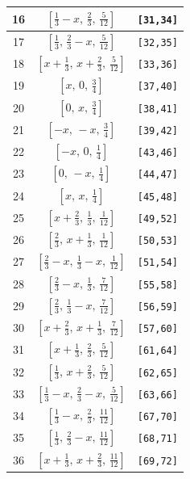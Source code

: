 \documentclass[fleqn,8pt]{jsarticle}
\begin{document}
\begin{longtable}{ccc}
16 & $\left[ \frac{1}{3} - x,\, \frac{2}{3},\, \frac{5}{12} \right]$ & {\tt [31,34]} \\ \hline
17 & $\left[ \frac{1}{3},\, \frac{2}{3} - x,\, \frac{5}{12} \right]$ & {\tt [32,35]} \\ \hline
18 & $\left[ x + \frac{1}{3},\, x + \frac{2}{3},\, \frac{5}{12} \right]$ & {\tt [33,36]} \\ \hline
19 & $\left[ x,\, 0,\, \frac{3}{4} \right]$ & {\tt [37,40]} \\ \hline
20 & $\left[ 0,\, x,\, \frac{3}{4} \right]$ & {\tt [38,41]} \\ \hline
21 & $\left[ - x,\, - x,\, \frac{3}{4} \right]$ & {\tt [39,42]} \\ \hline
22 & $\left[ - x,\, 0,\, \frac{1}{4} \right]$ & {\tt [43,46]} \\ \hline
23 & $\left[ 0,\, - x,\, \frac{1}{4} \right]$ & {\tt [44,47]} \\ \hline
24 & $\left[ x,\, x,\, \frac{1}{4} \right]$ & {\tt [45,48]} \\ \hline
25 & $\left[ x + \frac{2}{3},\, \frac{1}{3},\, \frac{1}{12} \right]$ & {\tt [49,52]} \\ \hline
26 & $\left[ \frac{2}{3},\, x + \frac{1}{3},\, \frac{1}{12} \right]$ & {\tt [50,53]} \\ \hline
27 & $\left[ \frac{2}{3} - x,\, \frac{1}{3} - x,\, \frac{1}{12} \right]$ & {\tt [51,54]} \\ \hline
28 & $\left[ \frac{2}{3} - x,\, \frac{1}{3},\, \frac{7}{12} \right]$ & {\tt [55,58]} \\ \hline
29 & $\left[ \frac{2}{3},\, \frac{1}{3} - x,\, \frac{7}{12} \right]$ & {\tt [56,59]} \\ \hline
30 & $\left[ x + \frac{2}{3},\, x + \frac{1}{3},\, \frac{7}{12} \right]$ & {\tt [57,60]} \\ \hline
31 & $\left[ x + \frac{1}{3},\, \frac{2}{3},\, \frac{5}{12} \right]$ & {\tt [61,64]} \\ \hline
32 & $\left[ \frac{1}{3},\, x + \frac{2}{3},\, \frac{5}{12} \right]$ & {\tt [62,65]} \\ \hline
33 & $\left[ \frac{1}{3} - x,\, \frac{2}{3} - x,\, \frac{5}{12} \right]$ & {\tt [63,66]} \\ \hline
34 & $\left[ \frac{1}{3} - x,\, \frac{2}{3},\, \frac{11}{12} \right]$ & {\tt [67,70]} \\ \hline
35 & $\left[ \frac{1}{3},\, \frac{2}{3} - x,\, \frac{11}{12} \right]$ & {\tt [68,71]} \\ \hline
36 & $\left[ x + \frac{1}{3},\, x + \frac{2}{3},\, \frac{11}{12} \right]$ & {\tt [69,72]} \\
\end{longtable}
\end{document}
